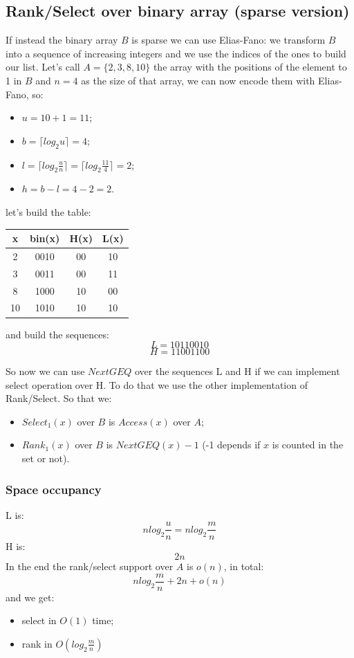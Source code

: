 \subsection{Rank/Select over binary array (sparse version)}
If instead the binary array $B$ is sparse we can use Elias-Fano: we transform $B$ into a sequence of increasing integers and we use the indices of the ones to build our list.
Let's call $A = \{2, 3, 8, 10\}$ the array with the positions of the element to 1 in $B$ and $n = 4$ as the size of that array, we can now encode them with Elias-Fano, so:
\begin{itemize}
    \item $u = 10+1 = 11$;
    \item $b = \lceil log_2 u \rceil = 4$;
    \item $l = \lceil log_2 \frac{u}{n} \rceil = \lceil log_2 \frac{11}{4} \rceil = 2$;
    \item $h = b-l = 4-2 = 2$.
\end{itemize}
let's build the table:
\begin{table}[H]
    \centering
    \begin{tabular}{c | c | c | c}
        x & bin(x) & H(x) & L(x) \\
        \hline
        2 & 0010 & 00 & 10 \\
        3 & 0011 & 00 & 11 \\
        8 & 1000 & 10 & 00 \\
        10 & 1010 & 10 & 10 \\
    \end{tabular}
\end{table}
and build the sequences:
$$
    L = 10110010
$$
$$
    H = 11001100
$$

So now we can use $NextGEQ$ over the sequences L and H if we can implement select operation over H.
To do that we use the other implementation of Rank/Select.
So that we:
\begin{itemize}
    \item $Select_1(x)$ over $B$ is $Access(x)$ over $A$;
    \item $Rank_1(x)$ over $B$ is $NextGEQ(x) -1$ (-1 depends if $x$ is counted in the set or not).
\end{itemize}

\subsubsection{Space occupancy}
L is:
$$
    nlog_2 \frac{u}{n} = nlog_2 \frac{m}{n}
$$
H is:
$$
    2n
$$
In the end the rank/select support over $A$ is $o(n)$, in total:
$$
    nlog_2 \frac{m}{n} + 2n + o(n)
$$
and we get:
\begin{itemize}
    \item select in $O(1)$ time;
    \item rank in $O\left(log_2 \frac{m}{n} \right)$
\end{itemize}

